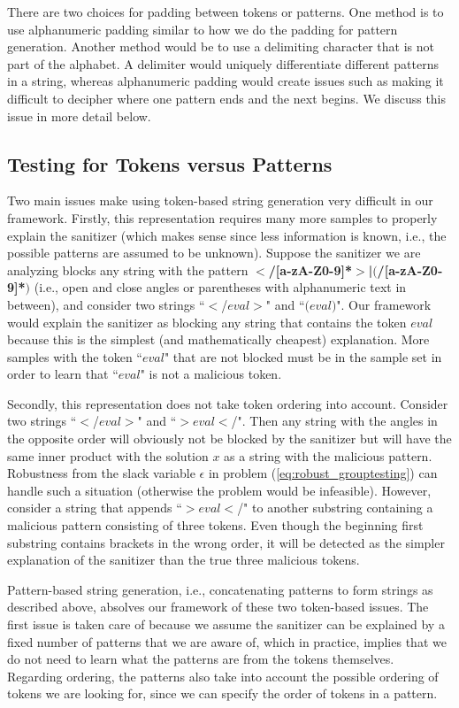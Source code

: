 There are two choices for padding between tokens or patterns. One method is to use alphanumeric padding similar to how we do the padding for pattern generation. Another method would be to use a delimiting character that is not part of the alphabet. A delimiter would uniquely differentiate different patterns in a string, whereas alphanumeric padding would create issues such as making it difficult to decipher where one pattern ends and the next begins. We discuss this issue in more detail below.

\subsection{Testing for Tokens versus Patterns}
Two main issues make using token-based string generation very difficult in our framework. Firstly, this representation requires many more samples to properly explain the sanitizer (which makes sense since less information is known, i.e., the possible patterns are assumed to be unknown). Suppose the sanitizer we are analyzing blocks any string with the pattern \textbf{$<$/[a-zA-Z0-9]*$>$|$($/[a-zA-Z0-9]*$)$} (i.e., open and close angles or parentheses with alphanumeric text in between), and consider two strings ``$<$/$eval$$>$" and ``$($$eval$$)$". Our framework would explain the sanitizer as blocking any string that contains the token $eval$ because this is the simplest (and mathematically cheapest) explanation. More samples with the token ``$eval$" that are not blocked must be in the sample set in order to learn that ``$eval$" is not a malicious token.

Secondly, this representation does not take token ordering into account. Consider two strings ``$<$/$eval$$>$" and ``$>$$eval$$<$/". Then any string with the angles in the opposite order will obviously not be blocked by the sanitizer but will have the same inner product with the solution $x$ as a string with the malicious pattern. Robustness from the slack variable $\epsilon$ in problem (\ref{eq:robust_grouptesting}) can handle such a situation (otherwise the problem would be infeasible). However, consider a string that appends ``$>$$eval$$<$/" to another substring containing a malicious pattern consisting of three tokens.  Even though the beginning first substring contains brackets in the wrong order, it will be detected as the simpler explanation of the sanitizer than the true three malicious tokens.

Pattern-based string generation, i.e., concatenating patterns to form strings as described above, absolves our framework of these two token-based issues. The first issue is taken care of because we assume the sanitizer can be explained by a fixed number of patterns that we are aware of, which in practice, implies that we do not need to learn what the patterns are from the tokens themselves. Regarding ordering, the patterns also take into account the possible ordering of tokens we are looking for, since we can specify the order of tokens in a pattern.

